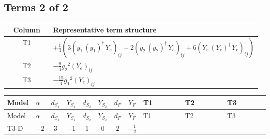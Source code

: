 \documentclass[8pt]{article}
\begin{document}
\begin{landscape}
\subsection*{Terms 2 of 2}
\begin{center}
\begin{tabular}{@{}c >{\raggedright\arraybackslash}p{0.82\linewidth}@{}}
\toprule
Column & Representative term structure \\
\midrule
T1 & \(\displaystyle +\frac{1}{4} (3 \left({y_1}\,\left({y_1}\right)^{\dagger}\,{Y_e}\right)_{ij}+2 \left({y_2}\,\left({y_2}\right)^{\dagger}\,{Y_e}\right)_{ij}+6 \left({Y_e}\,\left({Y_e}\right)^{\dagger}\,{Y_e}\right)_{ij})\) \\
\midrule
T2 & \(\displaystyle -\frac{9}{4} {g_2}^2 \left({Y_e}\right)_{ij}\) \\
\midrule
T3 & \(\displaystyle -\frac{15}{4} {g_1}^2 \left({Y_e}\right)_{ij}\) \\
\midrule
\bottomrule
\end{tabular}
\end{center}
\smallskip
\tiny
\begin{longtable}{@{}llcccccc >{\raggedright\arraybackslash}p{0.21\linewidth} >{\raggedright\arraybackslash}p{0.21\linewidth} >{\raggedright\arraybackslash}p{0.21\linewidth}@{}}
\toprule
Model & $\alpha$ & $d_{S_1}$ & $Y_{S_1}$ & $d_{S_2}$ & $Y_{S_2}$ & $d_F$ & $Y_F$ & T1 & T2 & T3 \\
\midrule
\endfirsthead
\toprule
Model & $\alpha$ & $d_{S_1}$ & $Y_{S_1}$ & $d_{S_2}$ & $Y_{S_2}$ & $d_F$ & $Y_F$ & T1 & T2 & T3 \\
\midrule
\endhead
T3-D & $-2$ & $3$ & $-1$ & $1$ & $0$ & $2$ & $-\frac{1}{2}$ & \scriptsize\adjustbox{max width=\linewidth}{$\begin{gathered} +\frac{1}{4} (3 \left({y_1}\,\left({y_1}\right)^{\dagger}\,{Y_e}\right)_{ij}+2 \left({y_2}\,\left({y_2}\right)^{\dagger}\,{Y_e}\right)_{ij}+6 \left({Y_e}\,\left({Y_e}\right)^{\dagger}\,{Y_e}\right)_{ij})\end{gathered}$} & \scriptsize\adjustbox{max width=\linewidth}{$\begin{gathered} -\frac{9}{4} {g_2}^2 \left({Y_e}\right)_{ij}\end{gathered}$} & \scriptsize\adjustbox{max width=\linewidth}{$\begin{gathered} -\frac{15}{4} {g_1}^2 \left({Y_e}\right)_{ij}\end{gathered}$} \\
\midrule
\bottomrule
\end{longtable}
\clearpage

\end{landscape}
\end{document}

